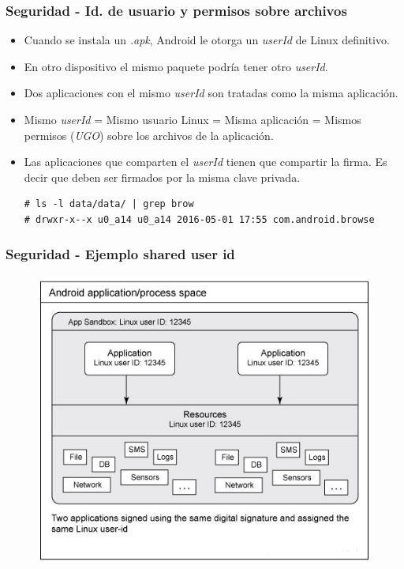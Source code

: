 \begin{frame}[fragile]
  \frametitle{Seguridad - Id. de usuario y permisos sobre archivos}
  \begin{itemize}
    \item Cuando se instala un \textit{.apk}, Android le otorga un \textit{userId} de Linux definitivo.
    
    \item En otro dispositivo el mismo paquete podría tener otro \textit{userId}.
    
    \item Dos aplicaciones con el mismo \textit{userId} son tratadas como la misma aplicación.
    
    \item Mismo \textit{userId} = Mismo usuario Linux = Misma aplicación = Mismos permisos (\textit{UGO}) sobre los archivos de la aplicación.
    
    \item Las aplicaciones que comparten el \textit{userId} tienen que compartir la firma. Es decir que deben ser firmados por la misma clave privada.

    \begin{lstlisting}
# ls -l data/data/ | grep brow                              
# drwxr-x--x u0_a14 u0_a14 2016-05-01 17:55 com.android.browse    
    \end{lstlisting}
  \end{itemize}
\end{frame}

\begin{frame}
  \frametitle{Seguridad - Ejemplo shared user id}
  \begin{figure}
    \centering
    \includegraphics[scale=0.4]{images/two-same-apps.jpg}
  \end{figure}
\end{frame}

